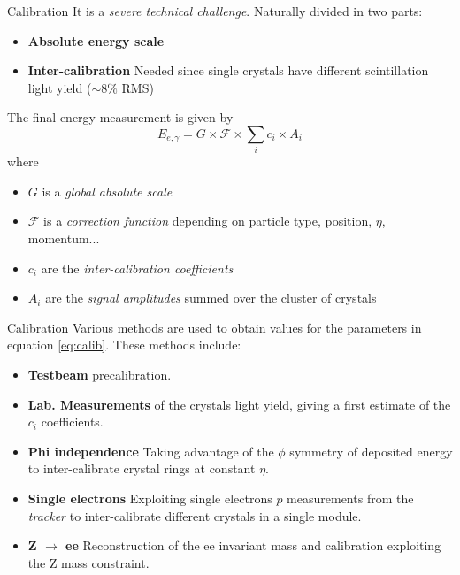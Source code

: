\documentclass[10pt]{beamer}
\begin{document}
\begin{frame}{Calibration}
    It is a \emph{severe technical challenge}.
    Naturally divided in two parts:
    \begin{itemize}
        \item \textbf{Absolute energy scale}
        \item \textbf{Inter-calibration} Needed since single crystals have different scintillation light yield ($\sim 8\%$ RMS)
    \end{itemize}
    The final energy measurement is given by
    \begin{equation}
        E_{e,\gamma} = G \times \mathcal{F} \times \sum_i c_i \times A_i
    \label{eq:calib}
    \end{equation}
    where
    \begin{itemize}
        \item $G$ is a \emph{global absolute scale}
        \item $\mathcal{F}$ is a \emph{correction function} depending on particle type, position, $\eta$, momentum...
        \item $c_i$ are the \emph{inter-calibration coefficients}
        \item $A_i$ are the \emph{signal amplitudes} summed over the cluster of crystals 
    \end{itemize}{}
    
\end{frame}

\begin{frame}{Calibration}
    Various methods are used to obtain values for the parameters in equation \eqref{eq:calib}. These methods include:
    
    \begin{itemize}
        \item \textbf{Testbeam} precalibration.
        \item \textbf{Lab. Measurements} of the crystals light yield, giving a first estimate of the $c_i$ coefficients.
        \item \textbf{Phi independence} Taking advantage of the $\phi$ symmetry of deposited energy to inter-calibrate crystal rings at constant $\eta$.
        \item \textbf{Single electrons} Exploiting single electrons $p$ measurements from the \emph{tracker} to inter-calibrate different crystals in a single module.
        \item \textbf{Z $\rightarrow$ ee} Reconstruction of the ee invariant mass and calibration exploiting the Z mass constraint. 
    \end{itemize}
    
\end{frame}
\end{document}
